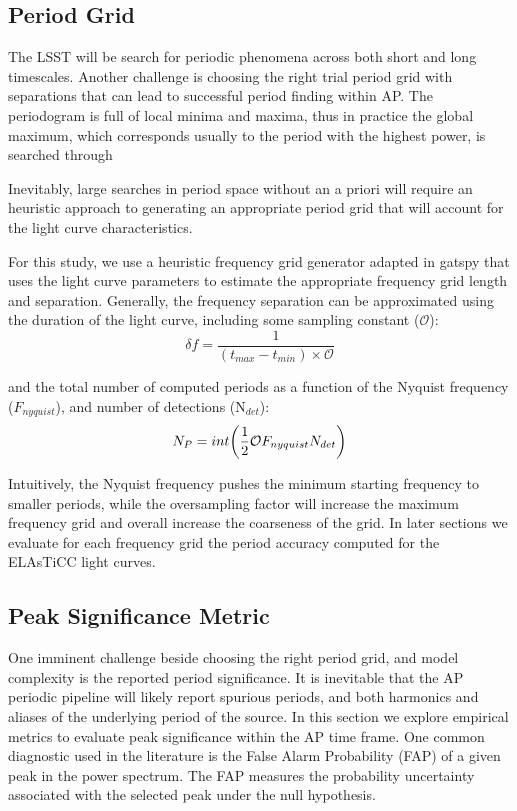 \documentclass[DM,authoryear,toc]{lsstdoc}
\begin{document}
\subsection{Period Grid}
The LSST will be search for periodic phenomena across both short and long timescales. Another challenge is choosing the right trial period grid with separations that can lead to successful period finding within AP. The periodogram is full of local minima and maxima, thus in practice the global maximum, which corresponds usually to the period with the highest power, is searched through 

Inevitably, large searches in period space without an a priori will require an heuristic approach to generating an appropriate period grid that will account for the light curve characteristics. 

For this study, we use a heuristic frequency grid generator adapted in gatspy that uses the light curve parameters to estimate the appropriate frequency grid length and separation. Generally, the frequency separation can be approximated using the duration of the light curve, including some sampling constant ($\mathcal{O}$):
\begin{equation}
\delta f = \frac{1}{(t_{max} - t_{min}) \times \mathcal{O}}
\end{equation}

and the total number of computed periods as a function of the Nyquist frequency ($F_{nyquist}$), and number of detections (N$_{det}$): 
\begin{equation}
N_{P} = int \bigg{(} \frac{1}{2} \mathcal{O} F_{nyquist} N_{det} \bigg{)}
\end{equation}

Intuitively, the Nyquist frequency pushes the minimum starting frequency to smaller periods, while the oversampling factor will increase the maximum frequency grid and overall increase the coarseness of the grid. In later sections we evaluate for each frequency grid the period accuracy computed for the ELAsTiCC light curves. 

\subsection{Peak Significance Metric}

One imminent challenge beside choosing the right period grid, and model complexity is the reported period significance. It is inevitable that the AP periodic pipeline will likely report spurious periods, and both harmonics and aliases of the underlying period of the source. In this section we explore empirical metrics to evaluate peak significance within the AP time frame. One common diagnostic used in the literature is the False Alarm Probability (FAP) of a given peak in the power spectrum. The FAP measures the probability uncertainty associated with the selected peak under the null hypothesis. 
\end{document}
